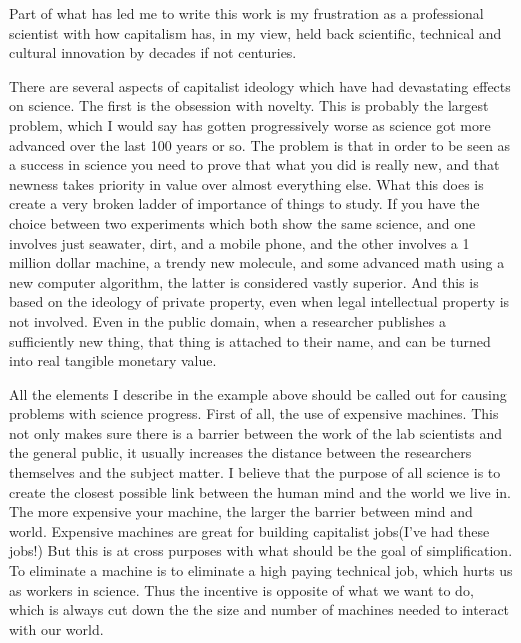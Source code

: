 Part of what has led me to write this work is my frustration as a
professional scientist with how capitalism has, in my view, held back
scientific, technical and cultural innovation by decades if not
centuries.

There are several aspects of capitalist ideology which have had
devastating effects on science. The first is the obsession with novelty.
This is probably the largest problem, which I would say has gotten
progressively worse as science got more advanced over the last 100 years
or so. The problem is that in order to be seen as a success in science
you need to prove that what you did is really new, and that newness
takes priority in value over almost everything else. What this does is
create a very broken ladder of importance of things to study. If you
have the choice between two experiments which both show the same
science, and one involves just seawater, dirt, and a mobile phone, and
the other involves a 1 million dollar machine, a trendy new molecule,
and some advanced math using a new computer algorithm, the latter is
considered vastly superior. And this is based on the ideology of private
property, even when legal intellectual property is not involved. Even in
the public domain, when a researcher publishes a sufficiently new thing,
that thing is attached to their name, and can be turned into real
tangible monetary value.

All the elements I describe in the example above should be called out
for causing problems with science progress. First of all, the use of
expensive machines. This not only makes sure there is a barrier between
the work of the lab scientists and the general public, it usually
increases the distance between the researchers themselves and the
subject matter. I believe that the purpose of all science is to create
the closest possible link between the human mind and the world we live
in. The more expensive your machine, the larger the barrier between mind
and world. Expensive machines are great for building capitalist
jobs(I've had these jobs!) But this is at cross purposes with what
should be the goal of simplification. To eliminate a machine is to
eliminate a high paying technical job, which hurts us as workers in
science. Thus the incentive is opposite of what we want to do, which is
always cut down the the size and number of machines needed to interact
with our world.

